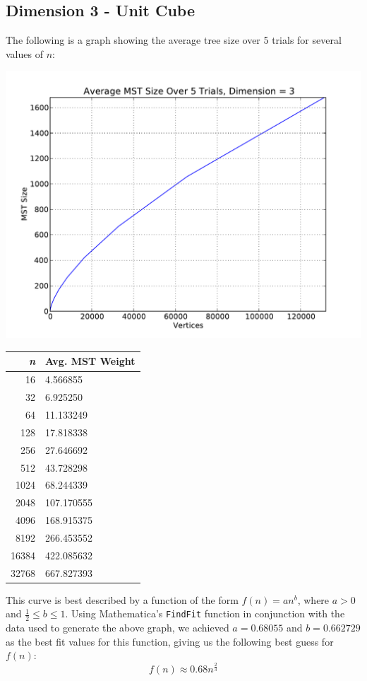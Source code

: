 \documentclass[solution, letterpaper]{cs121}
\begin{document}
\subsection*{Dimension 3 - Unit Cube}

The following is a graph showing the average tree size over 5 trials for several values of $n$:
\begin{center}
\includegraphics[scale=0.6]{graphs/kruskals-dimension-3.pdf}
\begin{tabular}{ | r | l |}
\hline
\bf{\itshape{n}} & \bf{Avg. MST Weight} \\
\hline
16 & 4.566855 \\
\hline
32 & 6.925250 \\
\hline
64 & 11.133249 \\
\hline
128 & 17.818338 \\
\hline
256 & 27.646692 \\
\hline
512 & 43.728298 \\
\hline
1024 & 68.244339 \\
\hline
2048 & 107.170555 \\
\hline
4096 & 168.915375 \\
\hline
8192 & 266.453552 \\
\hline
16384 & 422.085632\\
\hline
32768 & 667.827393\\
\hline
\end{tabular}
\end{center}

This curve is best described by a function of the form $f(n)=an^b$, where $a > 0$ and $\frac{1}{2} \leq b \leq 1$. Using Mathematica's {\tt FindFit} function in conjunction with the data used to generate the above graph, we achieved $a=0.68055$ and $b=0.662729$ as the best fit values for this function, giving us the following best guess for $f(n)$:
\[f(n) \approx 0.68n^{\frac{2}{3}}\]
\end{document}
